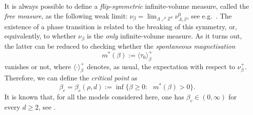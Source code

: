\documentclass[11pt,a4paper]{article}
\numberwithin{equation}{section}
\theoremstyle{plain}
\theoremstyle{definition}
\begin{document}
It is always possible to define a \emph{flip-symmetric} infinite-volume measure, called the \emph{free measure}, as the following weak limit: $\nu_{\beta}=\lim_{\Lambda\nearrow \mathbb{Z}^d} \nu_{\Lambda,\beta}^0$, see e.g.~\cite[Chapter~4.1]{GlimmJaffeQuantumBOOK}. The existence of a phase transition is related to the breaking of this 
symmetry, or, equivalently, to whether $\nu_\beta$ is the \emph{only} 
infinite-volume measure. As it turns out, the latter can be reduced to checking whether the \emph{spontaneous magnetisation}
\begin{equation}
    m^*(\beta)
    :=
    \langle \tau_0 \rangle^+_\beta
\end{equation}
vanishes or not, 
where $\langle \cdot \rangle^+_\beta$ denotes, as usual, the expectation with respect to $\nu_\beta^+$.
Therefore, we can define the \emph{critical point} as
\begin{equation}
    \beta_c=\beta_c(\rho,d)
    :=
    \inf\lbrace \beta\geq0:\text{ } m^*(\beta)>0\rbrace.
\end{equation}
It is known that, for all the models considered here, one has $\beta_c\in (0,\infty)$ for every $d\geq 2$, see \cite[Proposition~4.1]{PanaVeisubcrit}. 

\hfill
\end{document}
